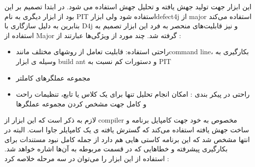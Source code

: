 این ابزار جهت تولید جهش یافته و تحلیل جهش استفاده می شود. در ابتدا تصمیم بر این بود از ابزار دیگری به نام PIT استفاده شود ولی ابزارdefect4j از major استفاده می‌کند بنابرین به دلیل سازگاری با D4j و نیز قابلیت‌های منحصر به فرد این ابزار تصمیم به استفاده از Major  گرفته شد. چند مورد از ویژگی‌ها عبارتند از :
\begin{itemize}

\item
 راحتی استفاده: قابلیت تعامل از روشهای مختلف مانندcommand lineِ، بکارگیری به وسیله ی ابزار build ant و دستورات کم نسبت به PIT
\item
 مجموعه عملگرهای کاملتر
\item
 راحتی در پیکر بندی : امکان انجام تحلیل تنها برای یک کلاس یا تابع، تنظیمات راحت و کامل جهت مشخص کردن مجموعه عملگرها
\end{itemize}
لازم به ذکر است که این ابزار از compiler‌ مخصوص به خود جهت کامپایل برنامه و ساخت جهش یافته استفاده می‌کند که گسترش یافته ی یک کامپایلر جاوا است. 
البته در انتها مشخص شد که این برنامه کاستی هایی هم دارد از جمله کامل نبود مستندات برای بکارگیری پیشرفته و خطاهایی که در قسمت مربوطه به آن‌ها اشاره خواهد شد. 
استفاده از این ابزار را می‌توان در سه مرحله خلاصه کرد :
